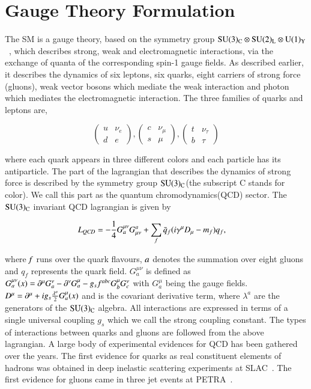 \section{Gauge Theory Formulation}


The SM is a gauge theory, based on the symmetry group $\rm SU(3)_{C} \otimes SU(2)_{L} \otimes U(1)_{Y}$~\cite{APichSM}, which describes strong, weak and electromagnetic interactions,  via the exchange of quanta of the corresponding spin-1 gauge fields. As described earlier, it describes the dynamics of six leptons, six quarks, eight carriers of strong force (gluons), weak vector bosons which mediate the weak interaction and photon which mediates the electromagnetic interaction. The three families of quarks and leptons are,


$$\left( \begin{array}{cc} u & \nu_{e} \\ d & e  \end{array} \right), \left( \begin{array}{cc} c & \nu_{\mu}  \\ s & \mu  \end{array} \right),\left( \begin{array}{cc} t & \nu_{\tau} \\ b & \tau  \end{array} \right)$$

where each quark appears in three different colors and each particle has its antiparticle. The part of the lagrangian that describes the dynamics of strong force is described by the symmetry group $\rm SU(3)_{C}$(the subscript C stands for color). We call this part as the quantum chromodynamics(QCD) sector. The $\rm SU(3)_{C}$ invariant QCD lagrangian is given by 

\begin{align} \label{LQCD}
\it L_{QCD} &= - \frac{1}{4} G^{\mu\nu}_{a}G^{a}_{\mu\nu} + \sum_{f} \bar{q}_{f} (i\gamma^{\mu}D_{\mu}- m_{f})q_{f},  
\end{align}

where $\it f$ runs over the quark flavours, $\it a$ denotes the summation over eight gluons and $q_{f}$ represents the quark field.  $G^{\mu\nu}_{a}$ is defined as $G^{\mu\nu}_{a}(x) = \partial^{\mu}G^{\nu}_{a} - \partial^{\nu}G^{\mu}_{a} - g_{s}f^{abc}G^{\mu}_{b}G^{\nu}_{c} $ with $G^{\mu}_{a}$ being the gauge fields. $D^{\mu} = \partial^{\mu} + ig_{s}\frac{\lambda^{a}}{2}G^{\mu}_{a}(x)$ and  is  the covariant derivative term, where  $\lambda^{a}$ are the generators of the $\rm SU(3)_{C}$
algebra. All interactions are expressed in terms of a single universal coupling $g_{s}$ which we call the strong coupling constant. The types of interactions between quarks and gluons are followed from the above lagrangian. A large body of experimental evidences for QCD has been gathered over the years. The first evidence for quarks as real constituent elements of hadrons was obtained in deep inelastic scattering experiments at SLAC~\cite{Quark1,Quark2}. The first evidence for gluons came in three jet events at PETRA~\cite{Gluon}.

